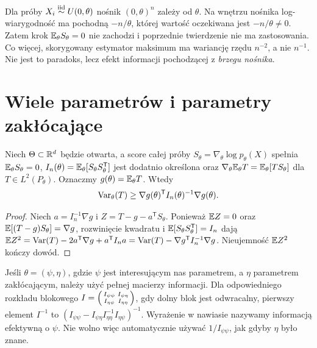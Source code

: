 \begin{uwaga}
Dla próby $X_i\mathrel{\overset{\mathrm{iid}}\sim} U(0,\theta)$ nośnik $(0,\theta)^n$
zależy od $\theta$. Na wnętrzu nośnika log-wiarygodność ma
pochodną $-n/\theta$, której wartość oczekiwana jest
$-n/\theta\ne0$. Zatem krok $\mathbb E_\theta S_\theta=0$
nie zachodzi i poprzednie twierdzenie nie ma zastosowania.
Co więcej, skorygowany estymator maksimum ma wariancję rzędu
$n^{-2}$, a nie $n^{-1}$. Nie jest to paradoks, lecz efekt
informacji pochodzącej z \emph{brzegu nośnika}.
\end{uwaga}

\section{Wiele parametrów i parametry zakłócające}
\begin{twierdzenie}
\label{thm:cr-matrix}
Niech $\Theta\subset\mathbb R^d$ będzie otwarta, a score całej próby
$S_\theta=\nabla_\theta\log p_\theta(X)$ spełnia
$\mathbb E_\theta S_\theta=0$, $I_n(\theta)=\mathbb E_\theta[S_\theta
S_\theta^{\mathsf T}]$ jest dodatnio określona oraz
$\nabla_\theta\mathbb E_\theta T=\mathbb E_\theta[T S_\theta]$ dla
$T\in L^2(P_\theta)$. Oznaczmy $g(\theta)=\mathbb E_\theta T$.
Wtedy
\[
\operatorname{Var}_\theta(T)\ge \nabla g(\theta)^{\mathsf T}
I_n(\theta)^{-1}\nabla g(\theta).
\]
\end{twierdzenie}
\begin{proof}
Niech $a=I_n^{-1}\nabla g$ i $Z=T-g-a^{\mathsf T}S_\theta$.
Ponieważ $\mathbb E Z=0$ oraz $\mathbb E[(T-g)S_\theta]=\nabla g$,
rozwinięcie kwadratu i $\mathbb E[S_\theta S_\theta^{\mathsf T}]=I_n$
dają $\mathbb E Z^2=\operatorname{Var}(T)-2a^{\mathsf T}\nabla g+a^{\mathsf T}I_na
=\operatorname{Var}(T)-\nabla g^{\mathsf T}I_n^{-1}\nabla g$.
Nieujemność $\mathbb E Z^2$ kończy dowód.
\end{proof}

Jeśli $\theta=(\psi,\eta)$, gdzie $\psi$ jest interesującym
nas parametrem, a $\eta$ parametrem zakłócającym, należy użyć
pełnej macierzy informacji. Dla odpowiedniego rozkładu blokowego
$I=\begin{psmallmatrix}I_{\psi\psi}&I_{\psi\eta}\\
I_{\eta\psi}&I_{\eta\eta}\end{psmallmatrix}$, gdy dolny blok
jest odwracalny, pierwszy element $I^{-1}$ to
$(I_{\psi\psi}-I_{\psi\eta}I_{\eta\eta}^{-1}I_{\eta\psi})^{-1}$.
Wyrażenie w nawiasie nazywamy informacją efektywną o $\psi$.
Nie wolno więc automatycznie używać $1/I_{\psi\psi}$,
jak gdyby $\eta$ było znane.

